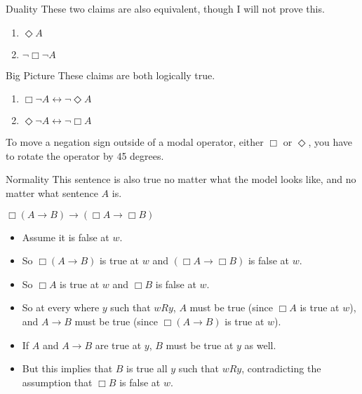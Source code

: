 \documentclass[
  ignorenonframetext,
]{beamer}
\providecommand{\tightlist}{%
  \setlength{\itemsep}{0pt}\setlength{\parskip}{0pt}}
\renewcommand{\,}{\text{, }}
\renewenvironment*{quote}	
	{\list{}{\rightmargin   \leftmargin} \item } 	
	{\endlist }
\begin{document}
\begin{frame}{Duality}
\protect\hypertarget{duality-2}{}
These two claims are also equivalent, though I will not prove this.

\begin{enumerate}
\tightlist
\item
  \(\Diamond A\)
\item
  \(\neg \Box \neg A\)
\end{enumerate}
\end{frame}

\begin{frame}{Big Picture}
\protect\hypertarget{big-picture}{}
These claims are both logically true.

\begin{enumerate}
\tightlist
\item
  \(\Box \neg A \leftrightarrow \neg \Diamond A\)
\item
  \(\Diamond \neg A \leftrightarrow \neg \Box A\)
\end{enumerate}

To move a negation sign outside of a modal operator, either \(\Box\) or
\(\Diamond\), you have to rotate the operator by 45 degrees.
\end{frame}

\begin{frame}{Normality}
\protect\hypertarget{normality}{}
This sentence is also true no matter what the model looks like, and no
matter what sentence \(A\) is.

\begin{quote}
\(\Box (A \rightarrow B) \rightarrow (\Box A \rightarrow \Box B)\)
\end{quote}

\begin{itemize}
\tightlist
\item
  Assume it is false at \(w\).
\item
  So \(\Box (A \rightarrow B)\) is true at \(w\) and
  \((\Box A \rightarrow \Box B)\) is false at \(w\).
\item
  So \(\Box A\) is true at \(w\) and \(\Box B\) is false at \(w\).
\item
  So at every where \(y\) such that \(wRy\), \(A\) must be true (since
  \(\Box A\) is true at \(w\)), and \(A \rightarrow B\) must be true
  (since \(\Box(A \rightarrow B)\) is true at \(w\)).
\item
  If \(A\) and \(A \rightarrow B\) are true at \(y\), \(B\) must be true
  at \(y\) as well.
\item
  But this implies that \(B\) is true all \(y\) such that \(wRy\),
  contradicting the assumption that \(\Box B\) is false at \(w\).
\end{itemize}
\end{frame}
\end{document}
